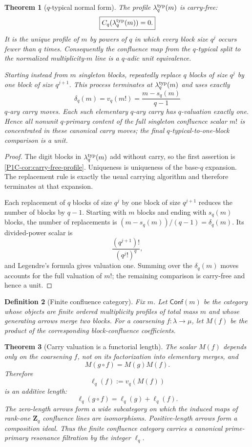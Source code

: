 \documentclass[11pt]{article}
\newtheorem{theorem}{Theorem}[section]
\newtheorem{definition}[theorem]{Definition}
\theoremstyle{remark}
\newcommand{\Z}{\mathbf Z}
\begin{document}
\begin{theorem}[$q$-typical normal form]\label{P1C-thm:q-typical-normal-form}
The profile $\lambda_q^{\rm typ}(m)$ is carry-free:
\[
 \boxed{C_q(\lambda_q^{\rm typ}(m))=0.}
\]
It is the unique profile of $m$ by powers of $q$ in which every block size $q^j$ occurs fewer than $q$ times.  Consequently the confluence map from the $q$-typical split to the normalized multiplicity-$m$ line is a $q$-adic unit equivalence.

Starting instead from $m$ singleton blocks, repeatedly replace $q$ blocks of size $q^j$ by one block of size $q^{j+1}$.  This process terminates at $\lambda_q^{\rm typ}(m)$ and uses exactly
\[
 \boxed{
 \delta_q(m)=v_q(m!)=\frac{m-s_q(m)}{q-1}}
\]
$q$-ary carry moves.  Each such elementary $q$-ary carry has $q$-valuation exactly one.  Hence all nonunit $q$-primary content of the full singleton confluence scalar $m!$ is concentrated in these canonical carry moves; the final $q$-typical-to-one-block comparison is a unit.
\end{theorem}

\begin{proof}
The digit blocks in $\lambda_q^{\rm typ}(m)$ add without carry, so the first assertion is \cref{P1C-cor:carry-free-profile}.  Uniqueness is uniqueness of the base-$q$ expansion.  The replacement rule is exactly the usual carrying algorithm and therefore terminates at that expansion.

Each replacement of $q$ blocks of size $q^j$ by one block of size $q^{j+1}$ reduces the number of blocks by $q-1$.  Starting with $m$ blocks and ending with $s_q(m)$ blocks, the number of replacements is $(m-s_q(m))/(q-1)=\delta_q(m)$.  Its divided-power scalar is
\[
 \frac{(q^{j+1})!}{(q^j!)^q},
\]
and Legendre's formula gives valuation one.  Summing over the $\delta_q(m)$ moves accounts for the full valuation of $m!$; the remaining comparison is carry-free and hence a unit.
\end{proof}

\begin{definition}[Finite confluence category]\label{P1C-def:finite-confluence-category}
Fix $m$.  Let $\mathsf{Conf}(m)$ be the category whose objects are finite ordered multiplicity profiles of total mass $m$ and whose generating arrows merge two blocks.  For a coarsening $f:\lambda\to\mu$, let $M(f)$ be the product of the corresponding block-confluence coefficients.
\end{definition}

\begin{theorem}[Carry valuation is a functorial length]\label{P1C-thm:carry-functorial-length}
The scalar $M(f)$ depends only on the coarsening $f$, not on its factorization into elementary merges, and
\[
 M(g\circ f)=M(g)M(f).
\]
Therefore
\[
 \boxed{\ell_q(f):=v_q(M(f))}
\]
is an additive length:
\[
 \ell_q(g\circ f)=\ell_q(g)+\ell_q(f).
\]
The zero-length arrows form a wide subcategory on which the induced maps of rank-one $\Z_q$ confluence lines are isomorphisms.  Positive-length arrows form a composition ideal.  Thus the finite confluence category carries a canonical prime-primary resonance filtration by the integer $\ell_q$.
\end{theorem}
\end{document}
